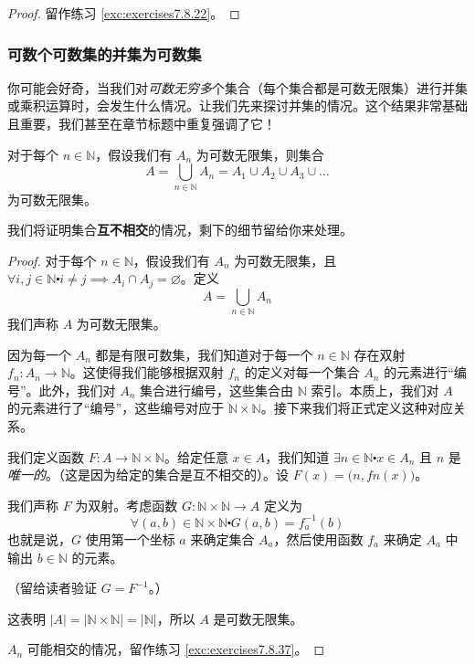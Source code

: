 \begin{proof}
    留作练习 \ref{exc:exercises7.8.22}。
\end{proof}

\subsubsection*{可数个可数集的并集为可数集}

你可能会好奇，当我们对\emph{可数无穷多}个集合（每个集合都是可数无限集）进行并集或乘积运算时，会发生什么情况。让我们先来探讨并集的情况。这个结果非常基础且重要，我们甚至在章节标题中重复强调了它！

\begin{theorem}\label{theorem7.6.22}
    对于每个 $n \in \mathbb{N}$，假设我们有 $A_n$ 为可数无限集，则集合
    \[A = \bigcup_{n \in \mathbb{N}} A_n = A_1 \cup A_2 \cup A_3 \cup \dots\]
    为可数无限集。
\end{theorem}

我们将证明集合\textbf{互不相交}的情况，剩下的细节留给你来处理。

\begin{proof}
    对于每个 $n \in \mathbb{N}$，假设我们有 $A_n$ 为可数无限集，且 $\forall i, j \in \mathbb{N} \centerdot i \ne j \implies A_i \cap A_j = \varnothing$。定义
    \[A = \bigcup_{n \in \mathbb{N}} A_n\]
    我们声称 $A$ 为可数无限集。

    因为每一个 $A_n$ 都是有限可数集，我们知道对于每一个 $n \in \mathbb{N}$ 存在双射 $f_n : A_n \to \mathbb{N}$。这使得我们能够根据双射 $f_n$ 的定义对每一个集合 $A_n$ 的元素进行``编号''。此外，我们对 $A_n$ 集合进行编号，这些集合由 $\mathbb{N}$ 索引。本质上，我们对 $A$ 的元素进行了``编号''，这些编号对应于 $\mathbb{N} \times \mathbb{N}$。接下来我们将正式定义这种对应关系。

    我们定义函数 $F : A \to \mathbb{N} \times \mathbb{N}$。给定任意 $x \in A$，我们知道 $\exists n \in \mathbb{N} \centerdot x \in A_n$ 且 $n$ 是\emph{唯一的}。（这是因为给定的集合是互不相交的）。设 $F(x) = \big(n, fn(x)\big)$。

    我们声称 $F$ 为双射。考虑函数 $G : \mathbb{N} \times \mathbb{N} \to A$ 定义为
    \[\forall (a, b) \in \mathbb{N} \times \mathbb{N} \centerdot G(a, b) = f_a^{-1}(b)\]
    也就是说，$G$ 使用第一个坐标 $a$ 来确定集合 $A_a$，然后使用函数 $f_a$ 来确定 $A_a$ 中输出 $b \in \mathbb{N}$ 的元素。

    （留给读者验证 $G = F^{-1}$。）

    这表明 $|A| = |\mathbb{N} \times \mathbb{N}| = |\mathbb{N}|$，所以 $A$ 是可数无限集。

    $A_n$ 可能相交的情况，留作练习 \ref{exc:exercises7.8.37}。
\end{proof}

